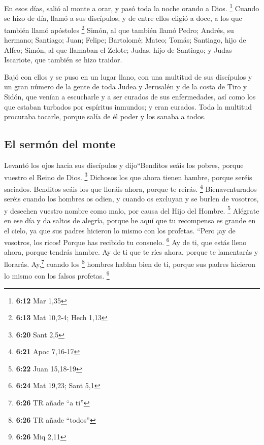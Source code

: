 \begin{paracol}{2}
 En esos días, salió al monte a orar, y pasó toda la
noche orando a Dios. \footnote{\textbf{6:12} Mar 1,35} 
Cuando se hizo de día, llamó a sus discípulos, y de entre ellos eligió a
doce, a los que también llamó apóstoles \footnote{\textbf{6:13} Mat
  10,2-4; Hech 1,13}  Simón, al que también llamó Pedro;
Andrés, su hermano; Santiago; Juan; Felipe; Bartolomé; 
Mateo; Tomás; Santiago, hijo de Alfeo; Simón, al que llamaban el Zelote;
 Judas, hijo de Santiago; y Judas Iscariote, que también
se hizo traidor.

 Bajó con ellos y se puso en un lugar llano, con una
multitud de sus discípulos y un gran número de la gente de toda Judea y
Jerusalén y de la costa de Tiro y Sidón, que venían a escucharle y a ser
curados de sus enfermedades,  así como los que estaban
turbados por espíritus inmundos; y eran curados.  Toda la
multitud procuraba tocarle, porque salía de él poder y los sanaba a
todos.

\hypertarget{el-sermuxf3n-del-monte}{%
\subsection{El sermón del monte}\label{el-sermuxf3n-del-monte}}

 Levantó los ojos hacia sus discípulos y dijo``Benditos
seáis los pobres, porque vuestro el Reino de Dios. \footnote{\textbf{6:20}
  Sant 2,5}  Dichosos los que ahora tienen hambre, porque
seréis saciados. Benditos seáis los que lloráis ahora, porque te reirás.
\footnote{\textbf{6:21} Apoc 7,16-17}  Bienaventurados
seréis cuando los hombres os odien, y cuando os excluyan y se burlen de
vosotros, y desechen vuestro nombre como malo, por causa del Hijo del
Hombre. \footnote{\textbf{6:22} Juan 15,18-19}  Alégrate
en ese día y da saltos de alegría, porque he aquí que tu recompensa es
grande en el cielo, ya que sus padres hicieron lo mismo con los
profetas.  ``Pero ¡ay de vosotros, los ricos! Porque has
recibido tu consuelo. \footnote{\textbf{6:24} Mat 19,23; Sant 5,1}
 Ay de ti, que estás lleno ahora, porque tendrás hambre.
Ay de ti que te ríes ahora, porque te lamentarás y llorarás.
 Ay,\footnote{\textbf{6:26} TR añade ``a ti''} cuando los
\footnote{\textbf{6:26} TR añade ``todos''} hombres hablan bien de ti,
porque sus padres hicieron lo mismo con los falsos profetas. \footnote{\textbf{6:26}
  Miq 2,11}


\end{paracol}
